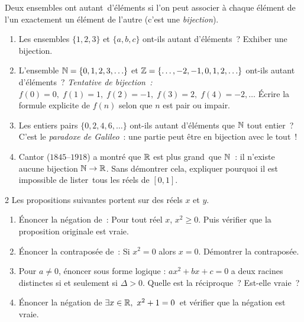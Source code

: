 \begin{challenge}
Deux ensembles ont \og autant\fg\ d'\'el\'ements si l'on peut associer
\`a chaque \'el\'ement de l'un exactement un \'el\'ement de l'autre
(c'est une \emph{bijection}).
\begin{enumerate}
  \item Les ensembles $\{1,2,3\}$ et $\{a,b,c\}$ ont-ils autant
        d'\'el\'ements~? Exhiber une bijection.
  \item L'ensemble $\mathbb{N} = \{0,1,2,3,\ldots\}$ et
        $\mathbb{Z} = \{\ldots,-2,-1,0,1,2,\ldots\}$
        ont-ils autant d'\'el\'ements~?
        \emph{Tentative de bijection~:}
        $f(0)=0,\; f(1)=1,\; f(2)=-1,\; f(3)=2,\; f(4)=-2,\ldots$
        \'Ecrire la formule explicite de $f(n)$ selon que $n$ est pair ou impair.
  \item Les entiers pairs $\{0,2,4,6,\ldots\}$ ont-ils autant d'\'el\'ements
        que $\mathbb{N}$ tout entier~?
        C'est le \emph{paradoxe de Galileo}~: une partie peut \^etre
        en bijection avec le tout~!
  \item Cantor ($1845$--$1918$) a montr\'e que $\mathbb{R}$ est \og plus grand\fg\ que $\mathbb{N}$~:
        il n'existe aucune bijection $\mathbb{N}\to\mathbb{R}$.
        Sans d\'emontrer cela, expliquer pourquoi il est impossible de
        \og lister\fg\ tous les r\'eels de $[0,1]$.
\end{enumerate}
\end{challenge}

\begin{probleme}{2}
Les propositions suivantes portent sur des r\'eels $x$ et $y$.
\begin{enumerate}
  \item \'Enoncer la n\'egation de~:
        \og Pour tout r\'eel $x$, $x^2 \geq 0$.\fg
        Puis v\'erifier que la proposition originale est vraie.
  \item \'Enoncer la contrapos\'ee de~:
        \og Si $x^2 = 0$ alors $x = 0$.\fg
        D\'emontrer la contrapos\'ee.
  \item Pour $a\ne0$, \'enoncer sous forme logique :
        \og $ax^2+bx+c=0$ a deux racines distinctes si et seulement si
        $\Delta > 0$.\fg
        Quelle est la r\'eciproque~? Est-elle vraie~?
  \item \'Enoncer la n\'egation de \og $\exists x\in\mathbb{R},\ x^2+1=0$\fg\ et
        v\'erifier que la n\'egation est vraie.
\end{enumerate}
\end{probleme}

